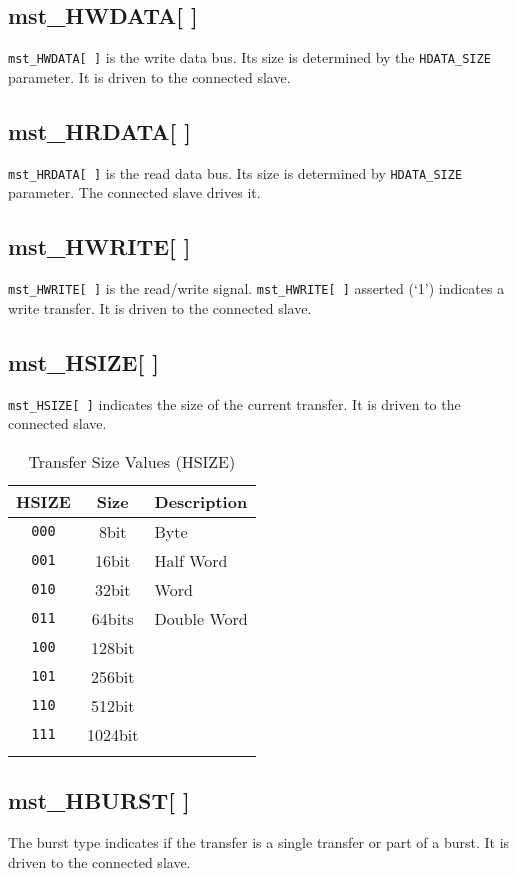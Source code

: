 \subsection{mst\_HWDATA[ ]}\label{mst_hwdata}

\texttt{mst\_HWDATA[\,]} is the write data bus. Its size is determined by the
\texttt{HDATA\_SIZE} parameter. It is driven to the connected slave.

\subsection{mst\_HRDATA[ ]}\label{mst_hrdata}

\texttt{mst\_HRDATA[\,]} is the read data bus. Its size is determined by \texttt{HDATA\_SIZE}
parameter. The connected slave drives it.

\subsection{mst\_HWRITE[ ]}\label{mst_hwrite}

\texttt{mst\_HWRITE[\,]} is the read/write signal. \texttt{mst\_HWRITE[\,]} asserted (`1') indicates a
write transfer. It is driven to the connected slave.

\subsection{mst\_HSIZE[ ]}\label{mst_hsize}

\texttt{mst\_HSIZE[\,]} indicates the size of the current transfer. It is driven to
the connected slave.

\begin{longtable}[]{@{}ccl@{}}
\toprule
HSIZE & Size & Description\tabularnewline
\midrule
\endhead
\texttt{000} & 8bit    & Byte\tabularnewline
\texttt{001} & 16bit   & Half Word\tabularnewline
\texttt{010} & 32bit   & Word\tabularnewline
\texttt{011} & 64bits  & Double Word\tabularnewline
\texttt{100} & 128bit  & \tabularnewline
\texttt{101} & 256bit  & \tabularnewline
\texttt{110} & 512bit  & \tabularnewline
\texttt{111} & 1024bit & \tabularnewline
\bottomrule
\caption{Transfer Size Values (HSIZE)}
\end{longtable}


\subsection{mst\_HBURST[ ]}\label{mst_hburst}

The burst type indicates if the transfer is a single transfer or part of
a burst. It is driven to the connected slave.

